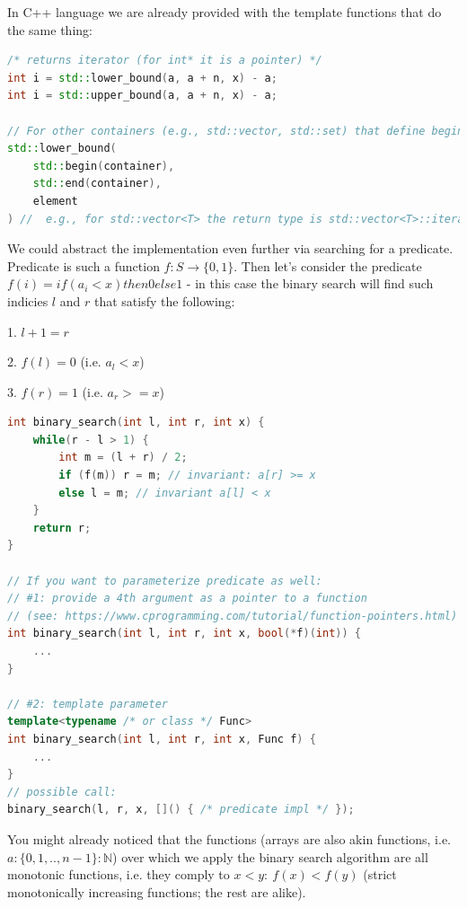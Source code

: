 
In C++ language we are already provided with the template functions that do the same thing:

\begin{lstlisting}[language=C++]
/* returns iterator (for int* it is a pointer) */
int i = std::lower_bound(a, a + n, x) - a;
int i = std::upper_bound(a, a + n, x) - a;

// For other containers (e.g., std::vector, std::set) that define begin()/end() operations use the following:
std::lower_bound(
    std::begin(container),
    std::end(container),
    element
) //  e.g., for std::vector<T> the return type is std::vector<T>::iterator, i.e. pointer to the element
\end{lstlisting}



We could abstract the implementation even further via searching for a predicate. Predicate is such a function $f: S \to \{0, 1\}$. Then let's consider the predicate $f(i) = if (a_i < x) then 0 else 1$ - in this case the binary search will find such indicies $l$ and $r$ that satisfy the following:

1. $l + 1 = r$

2. $f(l) = 0$ (i.e. $a_l < x$)

3. $f(r) = 1$ (i.e. $a_r >= x$)

\begin{lstlisting}[language=C++]
int binary_search(int l, int r, int x) {
    while(r - l > 1) {
        int m = (l + r) / 2;
        if (f(m)) r = m; // invariant: a[r] >= x
        else l = m; // invariant a[l] < x
    }
    return r;
}

// If you want to parameterize predicate as well:
// #1: provide a 4th argument as a pointer to a function
// (see: https://www.cprogramming.com/tutorial/function-pointers.html)
int binary_search(int l, int r, int x, bool(*f)(int)) {
    ...
}

// #2: template parameter
template<typename /* or class */ Func>
int binary_search(int l, int r, int x, Func f) {
    ...
}
// possible call:
binary_search(l, r, x, []() { /* predicate impl */ });
\end{lstlisting}


You might already noticed that the functions (arrays are also akin functions, i.e. $a: \{0, 1, .., n-1\}: \mathbb{N} $) over which we apply the binary search algorithm are all monotonic functions, i.e. they comply to $x < y: \ f(x) < f(y)$ (strict monotonically increasing functions; the rest are alike).

